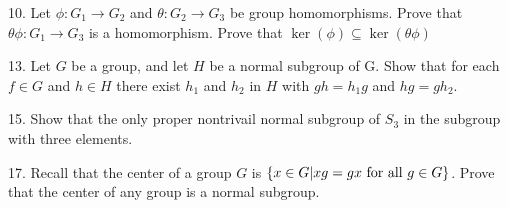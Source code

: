 \begin{mdframed}[style=darkQuesion]
  10. Let $\phi: G_{1} \rightarrow G_{2}$ and $\theta: G_{2} \rightarrow G_{3}$ be group homomorphisms. Prove that
  $\theta \phi: G_{1} \rightarrow G_{3}$ is a homomorphism. Prove that $\operatorname{ker}(\phi) \subseteq \operatorname{ker}(\theta \phi)$
\end{mdframed}
\begin{mdframed}[style=darkAnswer,frametitle={Joe Starr}]
\end{mdframed}
\newpage
\begin{mdframed}[style=darkQuesion]
  13. Let $G$ be a group, and let $H$ be a normal subgroup of G. Show that for 
  each $f\in G$ and $h\in H$ there exist $h_1$ and $h_2$ in $H$ with $gh=h_1g$
  and $hg=gh_2$.
\end{mdframed}
\begin{mdframed}[style=darkAnswer,frametitle={Joe Starr}]
\end{mdframed}
\newpage
\begin{mdframed}[style=darkQuesion]
  15. Show that the only proper nontrivail normal subgroup of $S_3$ in the 
  subgroup with three elements. 
\end{mdframed}
\begin{mdframed}[style=darkAnswer,frametitle={Joe Starr}]
\end{mdframed}
\newpage
\begin{mdframed}[style=darkQuesion]
17. Recall that the center of a group $G$ is 
$\left\{x\in G\vert xg=gx \text{ for all }g\in G\right\}$. 
Prove that the center of any group is a normal subgroup. 
\end{mdframed}
\begin{mdframed}[style=darkAnswer,frametitle={Joe Starr}]
\end{mdframed}
\newpage
